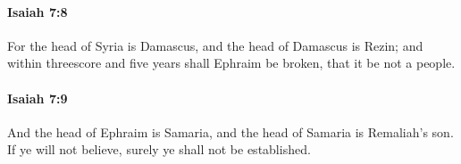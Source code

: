 		\paragraph{Isaiah 7:8} %
			\label{ISAIAH-7-8}

			For the head of Syria is Damascus, and the head of Damascus is Rezin; and within threescore and five years shall Ephraim be broken, that it be not a people.


		\paragraph{Isaiah 7:9} %
			\label{ISAIAH-7-9}

			And the head of Ephraim is Samaria, and the head of Samaria is Remaliah's son. If ye will not believe, surely ye shall not be established.


